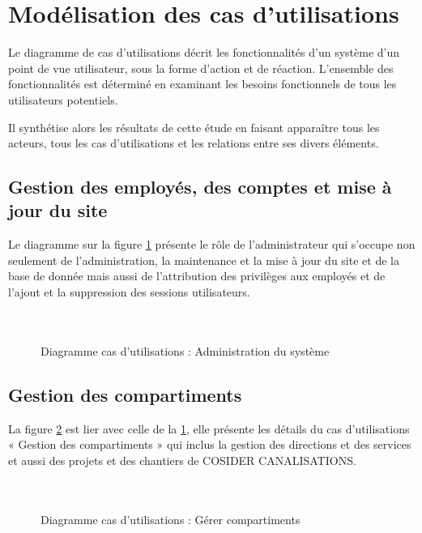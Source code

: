 \documentclass{report}
\begin{document}
\section{Modélisation des cas d'utilisations}
Le diagramme de cas d’utilisations décrit les fonctionnalités d’un système d’un point de vue utilisateur, sous la forme d’action et de réaction. L’ensemble des fonctionnalités est déterminé en examinant les besoins fonctionnels de tous les utilisateurs potentiels.

Il synthétise alors les résultats de cette étude en faisant apparaître tous les acteurs, tous les cas d’utilisations et les relations entre ses divers éléments.\cite{gl1}

\newpage
\subsection{Gestion des employés, des comptes et mise à jour du site}
Le diagramme sur la figure \ref{a} présente le rôle de l’administrateur qui s’occupe non seulement de l’administration, la maintenance et la mise à jour du site et de la base de donnée mais aussi de l’attribution des privilèges aux employés et de l’ajout et la suppression des sessions utilisateurs.\\\\\\
  \begin{figure}[h]
        \centering
        \caption{Diagramme cas d'utilisations : Administration du système}
        \label{a}
    \end{figure}

\newpage
\subsection{Gestion des compartiments}
La figure \ref{b} est lier avec celle de la \ref{a}, elle présente les détails du cas d’utilisations « Gestion des compartiments » qui inclus la gestion des directions et des services et aussi des projets et des chantiers de COSIDER CANALISATIONS.\\\\\\
  \begin{figure}[h]
        \centering
        \caption{Diagramme cas d'utilisations : Gérer compartiments}
        \label{b}
    \end{figure}
\end{document}
